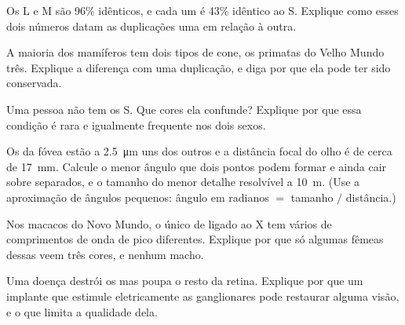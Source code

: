 \begin{exercise}[$\star\star$]\label{exo:g11:the-eye:10}
Os  L e M são 96\% idênticos, e cada um é 43\% idêntico ao S.
Explique como esses dois números datam as duplicações uma em relação à
outra.
\end{exercise}

\begin{exercise}[$\star\star$]\label{exo:g11:the-eye:11}
A maioria dos mamíferos tem dois tipos de cone, os primatas do Velho
Mundo três. Explique a diferença com uma duplicação, e diga por que ela
pode ter sido conservada.
\end{exercise}

\begin{exercise}[$\star\star\star$]\label{exo:g11:the-eye:12}
Uma pessoa não tem os  S. Que cores ela confunde? Explique por que
essa condição é rara e igualmente frequente nos dois sexos.
\end{exercise}

\begin{exercise}[$\star\star\star$]\label{exo:g11:the-eye:13}
Os  da fóvea estão a \qty{2.5}{\micro m} uns dos outros e a
distância focal do olho é de cerca de \qty{17}{mm}. Calcule o menor
ângulo que dois pontos podem formar e ainda cair sobre  separados,
e o tamanho do menor detalhe resolvível a \qty{10}{m}. (Use a
aproximação de ângulos pequenos: ângulo em radianos $=$ tamanho $/$
distância.)
\end{exercise}

\begin{exercise}[$\star\star\star$]\label{exo:g11:the-eye:14}
Nos macacos do Novo Mundo, o único  de  ligado ao X tem
vários  de comprimentos de onda de pico diferentes. Explique por
que só algumas fêmeas dessas  veem três cores, e nenhum macho.
\end{exercise}

\begin{exercise}[$\star\star\star$]\label{exo:g11:the-eye:15}
Uma doença destrói os  mas poupa o resto da retina.
Explique por que um implante que estimule eletricamente as 
ganglionares pode restaurar alguma visão, e o que limita a qualidade
dela.
\end{exercise}

